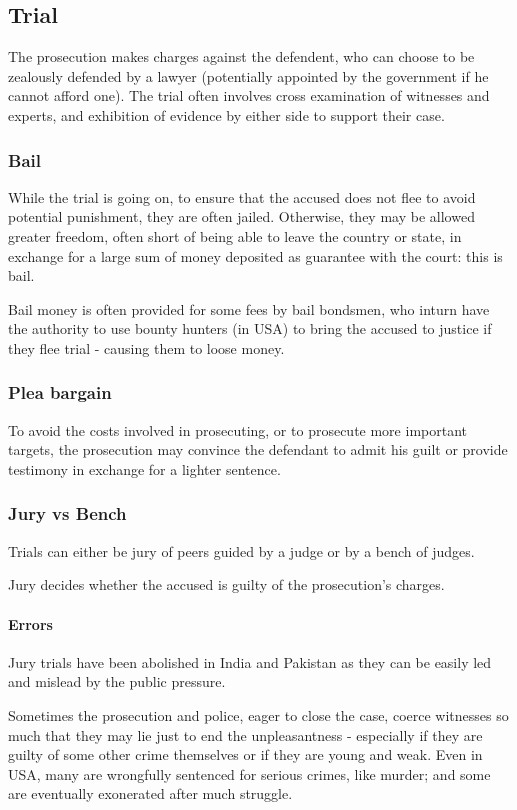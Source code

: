 \documentclass[oneside, article]{memoir}
\begin{document}
\subsection{Trial}
The prosecution makes charges against the defendent, who can choose to be zealously defended by a lawyer (potentially appointed by the government if he cannot afford one). The trial often involves cross examination of witnesses and experts, and exhibition of evidence by either side to support their case.

\subsubsection{Bail}
While the trial is going on, to ensure that the accused does not flee to avoid potential punishment, they are often jailed. Otherwise, they may be allowed greater freedom, often short of being able to leave the country or state, in exchange for a large sum of money deposited as guarantee with the court: this is bail.

Bail money is often provided for some fees by bail bondsmen, who inturn have the authority to use bounty hunters (in USA) to bring the accused to justice if they flee trial - causing them to loose money.

\subsubsection{Plea bargain}
To avoid the costs involved in prosecuting, or to prosecute more important targets, the prosecution may convince the defendant to admit his guilt or provide testimony in exchange for a lighter sentence.

\subsubsection{Jury vs Bench}
Trials can either be jury of peers guided by a judge or by a bench of judges. 

Jury decides whether the accused is guilty of the prosecution's charges.

\paragraph{Errors}
Jury trials have been abolished in India and Pakistan as they can be easily led and mislead by the public pressure.

Sometimes the prosecution and police, eager to close the case, coerce witnesses so much that they may lie just to end the unpleasantness - especially if they are guilty of some other crime themselves or if they are young and weak. Even in USA, many are wrongfully sentenced for serious crimes, like murder; and some are eventually exonerated after much struggle.
\end{document}
